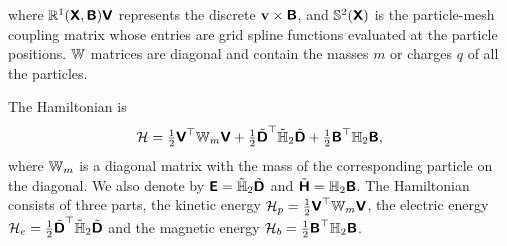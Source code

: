 \documentclass[11pt]{article}
\begin{document}
where $\matR^1(\arrX, \arrB) \arrV$ represents the discrete $\bf{v} \times \arrB$, and $\matS^2(\arrX)$ is the particle-mesh coupling matrix whose entries are grid spline functions evaluated at the particle positions. $\matW$ matrices are diagonal and contain the masses $m$ or charges $q$ of all the particles.

The Hamiltonian is
\begin{equation}
    \cH =   \tfrac 12 \arrV^\top \matW_m \arrV + \tfrac 12 \tilde\arrD^\top  \hodgeDualTwo \tilde\arrD + \tfrac 12 \arrB^\top \hodgeTwo \arrB,
\end{equation}
where $\matW_m$ is a diagonal matrix with the mass of the corresponding particle on the diagonal. We also denote by $\arrE =  \hodgeDualTwo \tilde\arrD$ and $\tilde{\arrH}=\hodgeTwo \arrB$.
The Hamiltonian consists of three parts, the kinetic energy $\cH_p = \tfrac 12 \arrV^\top \matW_m \arrV$, the electric energy $\cH_e = \tfrac 12 \tilde\arrD^\top  \hodgeDualTwo \tilde\arrD$
and the magnetic energy $\cH_b= \tfrac 12 \arrB^\top \hodgeTwo \arrB$.
\end{document}
